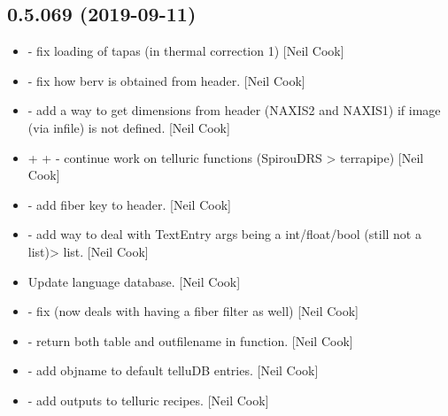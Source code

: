 \documentclass[a4paper,10pt,english]{report}
\begin{document}
\subsection{0.5.069 (2019-09-11)}
\label{\detokenize{misc/changelog:id73}}\begin{itemize}
\item {} 
 - fix loading of tapas (in thermal
correction 1) {[}Neil Cook{]}

\item {} 
 - fix how berv is obtained from header. {[}Neil
Cook{]}

\item {} 
 - add a way to get dimensions from header
(NAXIS2 and NAXIS1) if image (via infile) is not defined. {[}Neil Cook{]}

\item {} 
 +  +
 - continue work on telluric functions
(SpirouDRS \textendash{}\textgreater{} terrapipe) {[}Neil Cook{]}

\item {} 
 - add fiber key to header. {[}Neil
Cook{]}

\item {} 
 - add way to deal with TextEntry args being a
int/float/bool (still not a list)\textendash{}\textgreater{} list. {[}Neil Cook{]}

\item {} 
Update language database. {[}Neil Cook{]}

\item {} 
 - fix  (now deals with having a fiber filter
as well) {[}Neil Cook{]}

\item {} 
 - return both table and outfilename in 
function. {[}Neil Cook{]}

\item {} 
 - add objname to
default telluDB entries. {[}Neil Cook{]}

\item {} 
 - add outputs to
telluric recipes. {[}Neil Cook{]}


\end{itemize}
\end{document}
